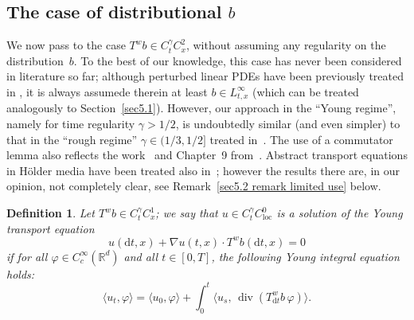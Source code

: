 \documentclass[10pt]{article}
\newcommand{\mathd}{\mathrm{d}}
\newcommand{\tmop}[1]{\ensuremath{\operatorname{#1}}}
\newtheorem{definition}{Definition}
\begin{document}
\subsection{The case of distributional $b$}

We now pass to the case $T^w b \in C^{\gamma}_t C^2_x$, without assuming any
regularity on the distribution~$b$. To the best of our knowledge, this case
has never been considered in literature so far; although perturbed linear PDEs
have been previously treated in {\cite{catellier,nilssen2020}}, it is always
assumede therein at least $b \in L^{\infty}_{t, x}$ (which can be treated
analogously to Section~\ref{sec5.1}). However, our approach in the ``Young
regime'', namely for time regularity $\gamma > 1 / 2$, is undoubtedly similar
(and even simpler) to that in the ``rough regime'' $\gamma \in (1 / 3, 1 / 2]$
treated in~{\cite{bailleul}}. The use of a commutator lemma also reflects the
work~{\cite{diperna}} and Chapter~9 from~{\cite{maurelli}}. Abstract transport
equations in H\"{o}lder media have been treated also in~{\cite{hu}}; however
the results there are, in our opinion, not completely clear, see
Remark~\ref{sec5.2 remark limited use} below.

\begin{definition}
  \label{sec5.2 defn transport}Let $T^w b \in C^{\gamma}_t C^1_x$; we say that
  $u \in C^{\gamma}_t C^0_{\tmop{loc}}$ is a solution of the Young transport
  equation
  \begin{equation}
    u (\mathd t, x) + \nabla u (t, x) \cdot T^w b (\mathd t, x) = 0
    \label{sec5.2 transport eq}
  \end{equation}
  if for all $\varphi \in C^{\infty}_c (\mathbb{R}^d)$ and all $t \in [0, T]$,
  the following Young integral equation holds:
  \begin{equation}
    \langle u_t, \varphi \rangle = \langle u_0, \varphi \rangle + \int_0^t
    \langle u_s, \, \tmop{div} \left( T^w_{\mathd t} b \, \varphi \right)
    \rangle . \label{sec5.2 transport eq integral}
  \end{equation}
\end{definition}
\end{document}
